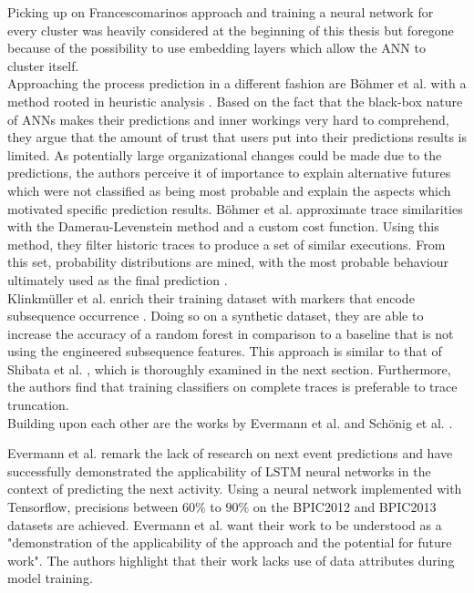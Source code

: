 Picking up on Francescomarinos approach and training a neural network for every cluster was heavily considered at the beginning of this thesis but foregone because of the possibility to use embedding layers which allow the ANN to cluster itself.\\

Approaching the process prediction in a different fashion are Böhmer et al. with a method rooted in heuristic analysis \cite{boehmer2018probability}. Based on the fact that the black-box nature of ANNs makes their predictions and inner workings very hard to comprehend, they argue that the amount of trust that users put into their predictions results is limited. As potentially large organizational changes could be made due to the predictions, the authors perceive it of importance to explain alternative futures which were not classified as being most probable and explain the aspects which motivated specific prediction results.
Böhmer et al. approximate trace similarities with the Damerau-Levenstein method and a custom cost function. Using this method, they filter historic traces to produce a set of similar executions. From this set, probability distributions are mined, with the most probable behaviour ultimately used as the final prediction \cite{boehmer2018probability}.\\

Klinkmüller et al. enrich their training dataset with markers that encode subsequence occurrence \cite{klinkmuller2018reliablemonitoring}. Doing so on a synthetic dataset, they are able to increase the accuracy of a random forest in comparison to a baseline that is not using the engineered subsequence features. This approach is similar to that of Shibata et al. \cite{shibata2016bipartite}, which is thoroughly examined in the next section. Furthermore, the authors find that training classifiers on complete traces is preferable to trace truncation.\\

Building upon each other are the works by Evermann et al. \cite{evermann2016} and Schönig et al. \cite{schoenig2018}.

Evermann et al. remark the lack of research on next event predictions and have successfully demonstrated the applicability of LSTM neural networks in the context of predicting the next activity. Using a neural network implemented with Tensorflow, precisions between $60\%$ to $90\%$ on the BPIC2012 and BPIC2013 datasets are achieved. Evermann et al. want their work to be understood as a "demonstration of the applicability of the approach and the potential for future work". The authors highlight that their work lacks use of data attributes during model training. 

